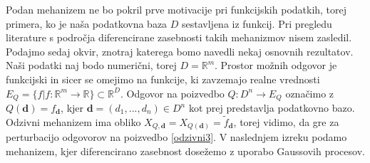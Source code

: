 \documentclass[12pt,a4paper]{amsart}
\theoremstyle{definition} %
\theoremstyle{plain} %
\begin{document}
\newline
Podan mehanizem ne bo pokril prve motivacije pri funkcijskih podatkih, torej primera, ko je naša podatkovna baza $D$ sestavljena iz funkcij. Pri pregledu literature s področja diferencirane zasebnosti takih mehanizmov nisem zasledil.
\newline
\newline
Podajmo sedaj okvir, znotraj katerega bomo navedli nekaj osnovnih rezultatov. Naši podatki naj bodo numerični, torej $D=\mathbb{R}^m$. Prostor možnih odgovor je funkcijski in sicer se omejimo na funkcije, ki zavzemajo realne vrednosti $E_Q = \{f | f : \mathbb{R}^m \rightarrow \mathbb{R}\} \subset \mathbb{R}^D$. Odgovor na poizvedbo $Q: D^n \rightarrow E_Q$ označimo z $Q(\textbf{d})=f_{\textbf{d}}$, kjer $\textbf{d} = (d_1,...,d_n) \in D^n$ kot prej predstavlja podatkovno bazo. Odzivni mehanizem ima obliko $X_{Q,\textbf{d}} = X_{Q(\textbf{d})} = \widetilde{f}_{\textbf{d}} $, torej vidimo, da gre za perturbacijo odgovorov na poizvedbo \eqref{odzivni3}. V naslednjem izreku podamo mehanizem, kjer diferencirano zasebnost dosežemo z uporabo Gaussovih procesov.
\end{document}
